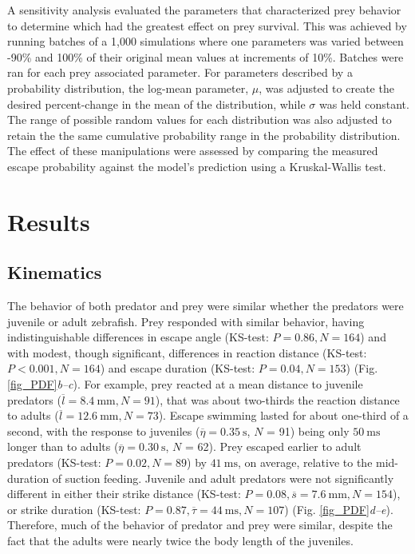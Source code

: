 \documentclass[]{rsos}%
\begin{document}
A sensitivity analysis evaluated the parameters that characterized prey behavior to determine which had the greatest effect on prey survival. 
This was achieved by running batches of a 1,000 simulations where one parameters was varied between -90\% and 100\% of their original mean values at increments of 10\%.
Batches  were ran for each prey associated parameter.
For parameters described by a probability distribution, the log-mean parameter, $\mu$, was adjusted to create the desired percent-change in the mean of the distribution, while $\sigma$ was held constant.
The range of possible random values for each distribution was also adjusted to retain the the same cumulative probability range in the probability distribution.
The effect of these manipulations were assessed by comparing the measured escape probability against the model's prediction using a Kruskal-Wallis test. 



\section{Results} %

\subsection{Kinematics} %
The behavior of both predator and prey were similar whether the predators were juvenile or adult zebrafish.
Prey responded with similar behavior, having indistinguishable differences in escape angle (KS-test: $P = 0.86, N = 164$) and with modest, though significant, differences in reaction distance (KS-test: $P < 0.001, N = 164$) and escape duration (KS-test: $P = 0.04, N = 153$) (Fig. \ref{fig_PDF}\textit{b--c}). 
For example, prey reacted at a mean distance to juvenile predators ($\overline{l} = \SI{8.4}{\mm}, N = 91$), that was about two-thirds the reaction distance to adults ($\overline{l} = \SI{12.6}{\mm}, N = 73$).
Escape swimming lasted for about one-third of a second, with the response to juveniles ($\overline{\eta} = \SI{0.35}{\s}$, $N$ = 91) being only  $\SI{50}{\ms}$ longer than to adults ($\overline{\eta} = \SI{0.30}{\s}$, $N$ = 62).
Prey escaped earlier to adult predators (KS-test: $P = 0.02, N = 89$) by $\SI{41}{\ms}$, on average, relative to the mid-duration of suction feeding.
Juvenile and adult predators were not significantly different in either their strike distance (KS-test: $P = 0.08, \overline{s} = \SI{7.6}{\mm}, N = 154$), or strike duration (KS-test: $P = 0.87, \overline{\tau} = \SI{44}{\ms}, N = 107$) (Fig. \ref{fig_PDF}\textit{d--e}).
Therefore, much of the behavior of predator and prey were similar, despite the fact that the adults were nearly twice the body length of the juveniles.
\end{document}
